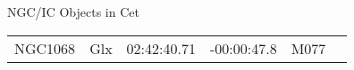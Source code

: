 \begin{block}{NGC/IC Objects in Cet}
  \centering
  \begin{tabularx}{\textwidth}{llrrll} 
    NGC1068 & Glx & 02:42:40.71 & -00:00:47.8  & M077 \\ 
  \end{tabularx}
\end{block}